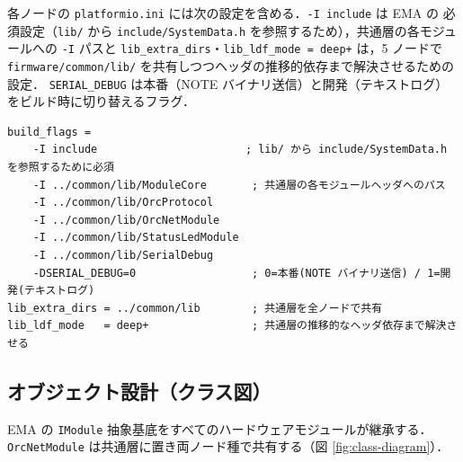 \documentclass[lualatex,book,paper=a4paper,jafontsize=11.5pt,jafontscale=1.05]{jlreq}
\begin{document}
各ノードの \texttt{platformio.ini} には次の設定を含める．\texttt{-I include} は EMA の
必須設定（\texttt{lib/} から \texttt{include/SystemData.h} を参照するため），共通層の各モジュールへの
\texttt{-I} パスと \texttt{lib\_extra\_dirs}・\texttt{lib\_ldf\_mode = deep+} は，5 ノードで
\texttt{firmware/common/lib/} を共有しつつヘッダの推移的依存まで解決させるための設定．
\texttt{SERIAL\_DEBUG} は本番（NOTE バイナリ送信）と開発（テキストログ）をビルド時に切り替えるフラグ．

\begin{tcolorbox}[colback=codebg,colframe=black,boxrule=0.5pt,arc=2pt,breakable,
  left=4pt,right=4pt,top=8pt,bottom=4pt,
  title={platformio.ini 共通部の必須設定（楽器ノードの例）},
  fonttitle=\bfseries\small,coltitle=black,
  attach boxed title to top left={xshift=4mm,yshift*=-2mm},
  boxed title style={colback=white,colframe=black,sharp corners=northwest}]
\begin{Verbatim}[fontsize=\footnotesize,xleftmargin=2pt]
build_flags =
    -I include                       ; lib/ から include/SystemData.h を参照するために必須
    -I ../common/lib/ModuleCore       ; 共通層の各モジュールヘッダへのパス
    -I ../common/lib/OrcProtocol
    -I ../common/lib/OrcNetModule
    -I ../common/lib/StatusLedModule
    -I ../common/lib/SerialDebug
    -DSERIAL_DEBUG=0                  ; 0=本番(NOTE バイナリ送信) / 1=開発(テキストログ)
lib_extra_dirs = ../common/lib        ; 共通層を全ノードで共有
lib_ldf_mode   = deep+                ; 共通層の推移的なヘッダ依存まで解決させる
\end{Verbatim}
\end{tcolorbox}

\subsection{オブジェクト設計（クラス図）}\label{subsec:class-design}

EMA の \texttt{IModule} 抽象基底をすべてのハードウェアモジュールが継承する．
\texttt{OrcNetModule} は共通層に置き両ノード種で共有する（図 \ref{fig:class-diagram}）．
\end{document}
